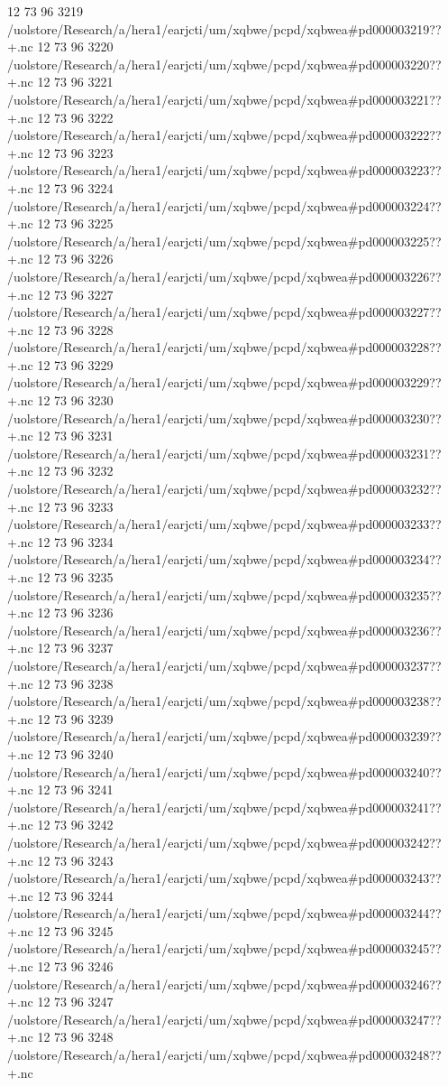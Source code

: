 12 73 96
3219
/uolstore/Research/a/hera1/earjcti/um/xqbwe/pcpd/xqbwea#pd000003219??+.nc
12 73 96
3220
/uolstore/Research/a/hera1/earjcti/um/xqbwe/pcpd/xqbwea#pd000003220??+.nc
12 73 96
3221
/uolstore/Research/a/hera1/earjcti/um/xqbwe/pcpd/xqbwea#pd000003221??+.nc
12 73 96
3222
/uolstore/Research/a/hera1/earjcti/um/xqbwe/pcpd/xqbwea#pd000003222??+.nc
12 73 96
3223
/uolstore/Research/a/hera1/earjcti/um/xqbwe/pcpd/xqbwea#pd000003223??+.nc
12 73 96
3224
/uolstore/Research/a/hera1/earjcti/um/xqbwe/pcpd/xqbwea#pd000003224??+.nc
12 73 96
3225
/uolstore/Research/a/hera1/earjcti/um/xqbwe/pcpd/xqbwea#pd000003225??+.nc
12 73 96
3226
/uolstore/Research/a/hera1/earjcti/um/xqbwe/pcpd/xqbwea#pd000003226??+.nc
12 73 96
3227
/uolstore/Research/a/hera1/earjcti/um/xqbwe/pcpd/xqbwea#pd000003227??+.nc
12 73 96
3228
/uolstore/Research/a/hera1/earjcti/um/xqbwe/pcpd/xqbwea#pd000003228??+.nc
12 73 96
3229
/uolstore/Research/a/hera1/earjcti/um/xqbwe/pcpd/xqbwea#pd000003229??+.nc
12 73 96
3230
/uolstore/Research/a/hera1/earjcti/um/xqbwe/pcpd/xqbwea#pd000003230??+.nc
12 73 96
3231
/uolstore/Research/a/hera1/earjcti/um/xqbwe/pcpd/xqbwea#pd000003231??+.nc
12 73 96
3232
/uolstore/Research/a/hera1/earjcti/um/xqbwe/pcpd/xqbwea#pd000003232??+.nc
12 73 96
3233
/uolstore/Research/a/hera1/earjcti/um/xqbwe/pcpd/xqbwea#pd000003233??+.nc
12 73 96
3234
/uolstore/Research/a/hera1/earjcti/um/xqbwe/pcpd/xqbwea#pd000003234??+.nc
12 73 96
3235
/uolstore/Research/a/hera1/earjcti/um/xqbwe/pcpd/xqbwea#pd000003235??+.nc
12 73 96
3236
/uolstore/Research/a/hera1/earjcti/um/xqbwe/pcpd/xqbwea#pd000003236??+.nc
12 73 96
3237
/uolstore/Research/a/hera1/earjcti/um/xqbwe/pcpd/xqbwea#pd000003237??+.nc
12 73 96
3238
/uolstore/Research/a/hera1/earjcti/um/xqbwe/pcpd/xqbwea#pd000003238??+.nc
12 73 96
3239
/uolstore/Research/a/hera1/earjcti/um/xqbwe/pcpd/xqbwea#pd000003239??+.nc
12 73 96
3240
/uolstore/Research/a/hera1/earjcti/um/xqbwe/pcpd/xqbwea#pd000003240??+.nc
12 73 96
3241
/uolstore/Research/a/hera1/earjcti/um/xqbwe/pcpd/xqbwea#pd000003241??+.nc
12 73 96
3242
/uolstore/Research/a/hera1/earjcti/um/xqbwe/pcpd/xqbwea#pd000003242??+.nc
12 73 96
3243
/uolstore/Research/a/hera1/earjcti/um/xqbwe/pcpd/xqbwea#pd000003243??+.nc
12 73 96
3244
/uolstore/Research/a/hera1/earjcti/um/xqbwe/pcpd/xqbwea#pd000003244??+.nc
12 73 96
3245
/uolstore/Research/a/hera1/earjcti/um/xqbwe/pcpd/xqbwea#pd000003245??+.nc
12 73 96
3246
/uolstore/Research/a/hera1/earjcti/um/xqbwe/pcpd/xqbwea#pd000003246??+.nc
12 73 96
3247
/uolstore/Research/a/hera1/earjcti/um/xqbwe/pcpd/xqbwea#pd000003247??+.nc
12 73 96
3248
/uolstore/Research/a/hera1/earjcti/um/xqbwe/pcpd/xqbwea#pd000003248??+.nc
